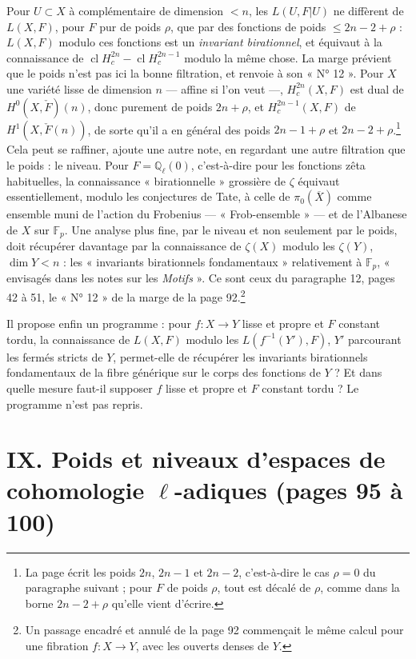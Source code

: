 \documentclass[11pt,a4paper]{article}
\begin{document}
Pour $U \subset X$ à complémentaire de dimension $< n$, les $L(U, F|U)$ ne
diffèrent de $L(X, F)$, pour $F$ pur de poids $\rho$, que par des fonctions de
poids $\leqslant 2n-2+\rho$ : $L(X, F)$ modulo ces fonctions est un \emph{invariant
birationnel}, et équivaut à la connaissance de $\operatorname{cl}H^{2n}_{c} -
\operatorname{cl}H^{2n-1}_{c}$ modulo la même chose. La marge prévient que le
poids n'est pas ici la bonne filtration, et renvoie à son « N° 12 ». Pour $X$
une variété lisse de dimension $n$ --- affine si l'on veut ---, $H^{2n}_{c}(X, F)$
est dual de $H^{0}(X, \check{F})(n)$, donc purement de poids $2n + \rho$, et
$H^{2n-1}_{c}(X, F)$ de $H^{1}(X, \check{F}(n))$, de sorte qu'il a en général
des poids $2n-1+\rho$ et $2n-2+\rho$.\footnote{La page écrit les poids $2n$,
$2n-1$ et $2n-2$, c'est-à-dire le cas $\rho = 0$ du paragraphe suivant ; pour
$F$ de poids $\rho$, tout est décalé de $\rho$, comme dans la borne
$2n - 2 + \rho$ qu'elle vient d'écrire.} Cela peut se raffiner, ajoute une
autre note, en regardant une autre filtration que le poids : le niveau. Pour $F
= \mathbb{Q}_{\ell}(0)$, c'est-à-dire pour les fonctions zêta habituelles, la
connaissance « birationnelle » grossière de $\zeta$ équivaut essentiellement,
modulo les conjectures de Tate, à celle de $\pi_{0}(\overline{X})$ comme
ensemble muni de l'action du Frobenius --- « Frob-ensemble » --- et de
l'Albanese de $X$ sur $\mathbb{F}_{p}$. Une analyse plus fine, par le niveau et
non seulement par le poids, doit récupérer davantage par la connaissance de
$\zeta(X)$ modulo les $\zeta(Y)$, $\dim Y < n$ : les « invariants birationnels
fondamentaux » relativement à $\mathbb{F}_{p}$, « envisagés dans les notes sur
les \emph{Motifs} ». Ce sont ceux du paragraphe 12, pages 42 à 51, le
« N° 12 » de la marge de la page 92.\footnote{Un passage encadré et
annulé de la page 92 commençait le même calcul pour une fibration $f \colon X \to
Y$, avec les ouverts denses de $Y$.}

Il propose enfin un programme : pour $f \colon X \to Y$ lisse et propre et $F$
constant tordu, la connaissance de $L(X, F)$ modulo les $L(f^{-1}(Y'), F)$,
$Y'$ parcourant les fermés stricts de $Y$, permet-elle de récupérer les invariants
birationnels fondamentaux de la fibre générique sur le corps des fonctions de
$Y$ ? Et dans quelle mesure faut-il supposer $f$ lisse et propre et $F$
constant tordu ? Le programme n'est pas repris.

\section*{IX. Poids et niveaux d'espaces de cohomologie $\ell$-adiques (pages 95 à 100)}
\end{document}
